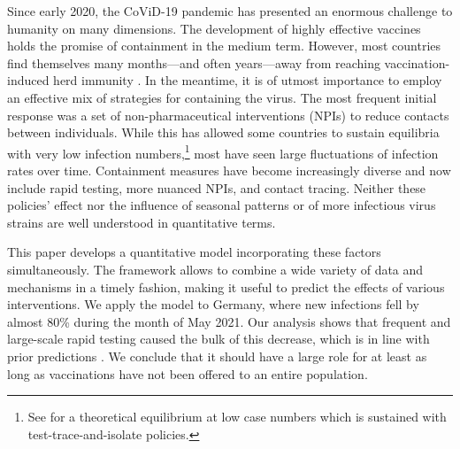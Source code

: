 


Since early 2020, the CoViD-19 pandemic has
presented an enormous challenge to humanity on many dimensions. The development of highly
effective vaccines holds the promise of containment in the medium term. However, most
countries find themselves many months---and often years---away from reaching
vaccination-induced herd immunity \citep{Swaminathan2021}. In the meantime, it is of utmost
importance to employ an effective mix of strategies for containing the virus. The most
frequent initial response was a set of non-pharmaceutical interventions (NPIs) to reduce
contacts between individuals. While this has allowed some countries to sustain equilibria
with very low infection numbers,\footnote{See \citet{Contreras2021} for a theoretical
equilibrium at low case numbers which is sustained with test-trace-and-isolate policies.}
most have seen large fluctuations of infection rates over time. Containment measures have
become increasingly diverse and now include rapid testing, more nuanced NPIs, and contact
tracing. Neither these policies' effect nor the influence of seasonal patterns or of more
infectious virus strains are well understood in quantitative terms.

This paper develops a quantitative model incorporating these factors simultaneously. The
framework allows to combine a wide variety of data and mechanisms in a timely fashion,
making it useful to predict the effects of various interventions. We apply the model to
Germany, where new infections fell by almost 80\% during the month of May 2021. Our
analysis shows that frequent and large-scale rapid testing caused the bulk of this
decrease, which is in line with prior predictions \citep{Mina2021}. We conclude that it
should have a large role for at least as long as vaccinations have not been offered to
an entire population.

